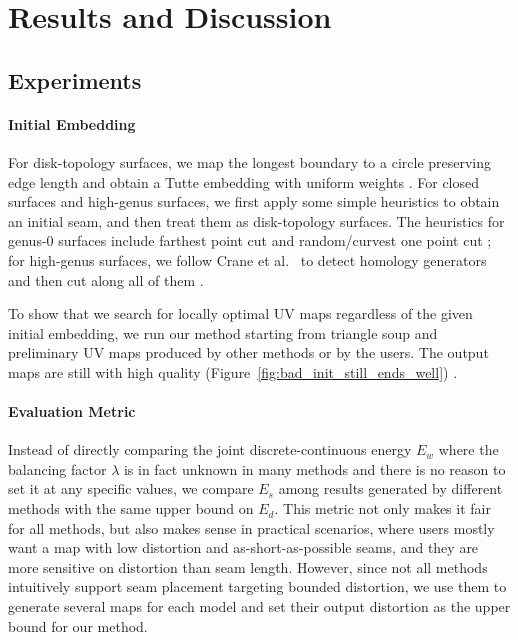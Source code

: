 
\section{Results and Discussion}
\label{sec:results}

\subsection{Experiments}
\label{sec:results_exp}

\paragraph{Initial Embedding} For disk-topology surfaces, we map the longest boundary to a circle preserving edge length and obtain a Tutte embedding with uniform weights . For closed surfaces and high-genus surfaces, we first apply some simple heuristics to obtain an initial seam, and then treat them as disk-topology surfaces.  
The heuristics for genus-0 surfaces include  farthest point cut and random/curvest one point cut ; for high-genus surfaces, we follow Crane et al.~ to detect homology generators and then cut along all of them \minchen{[TODO]}.

To show that we search for locally optimal UV maps regardless of the given initial embedding, we run our method starting from triangle soup and preliminary UV maps produced by other methods or by the users. The output maps are still with high quality (Figure~\ref{fig:bad_init_still_ends_well}) \minchen{[TODO]}.

\paragraph{Evaluation Metric} Instead of directly comparing the joint discrete-continuous energy $E_w$ where the balancing factor $\lambda$ is in fact unknown in many methods and there is no reason to set it at any specific values, we compare $E_s$ among results generated by different methods with the same upper bound on $E_d$.  This metric not only makes it fair for all methods, but also makes sense in practical scenarios, where users mostly want a map with low distortion and as-short-as-possible seams, and they are more sensitive on distortion than seam length. However, since not all methods intuitively support seam placement targeting bounded distortion, we use them to generate several maps for each model and set their output distortion as the upper bound for our method.

